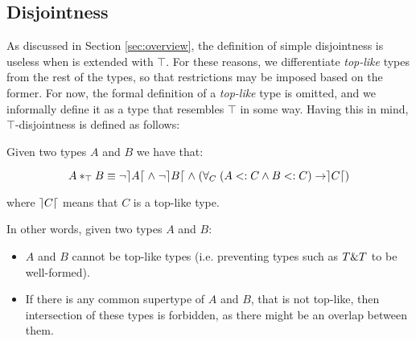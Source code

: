
\subsection{Disjointness} 
As discussed in Section \ref{sec:overview}, the definition of
simple disjointness is useless when \name is extended with $\top$.
For these reasons, we differentiate \emph{top-like} types from the rest of the types,
so that restrictions may be imposed based on the former.
For now, the formal definition of a \emph{top-like} type is omitted,
and we informally define it as a type that resembles $\top$ in some way. 
Having this in mind, $\top$-disjointness is defined as follows:
\begin{definition}
Given two types $A$ and $B$ we have that:

\[A *_{\top} B \equiv \neg \rceil A \lceil \; \wedge \; \neg \rceil B \lceil \; \wedge \; 
(\forall_C \; ( A <: C \wedge B <: C ) \rightarrow \rceil C \lceil) \]

\noindent where $\rceil C \lceil$ means that $C$ is a top-like type.
\end{definition}

\noindent In other words, given two
types $A$ and $B$:
\begin{itemize}
\item $A$ and $B$ cannot be top-like types (i.e. preventing types such as $T \& T$ to be well-formed).
\item If there is any common supertype of $A$ and $B$, that is not top-like, then 
intersection of these types is forbidden, as there might be an overlap between them.
\end{itemize}

